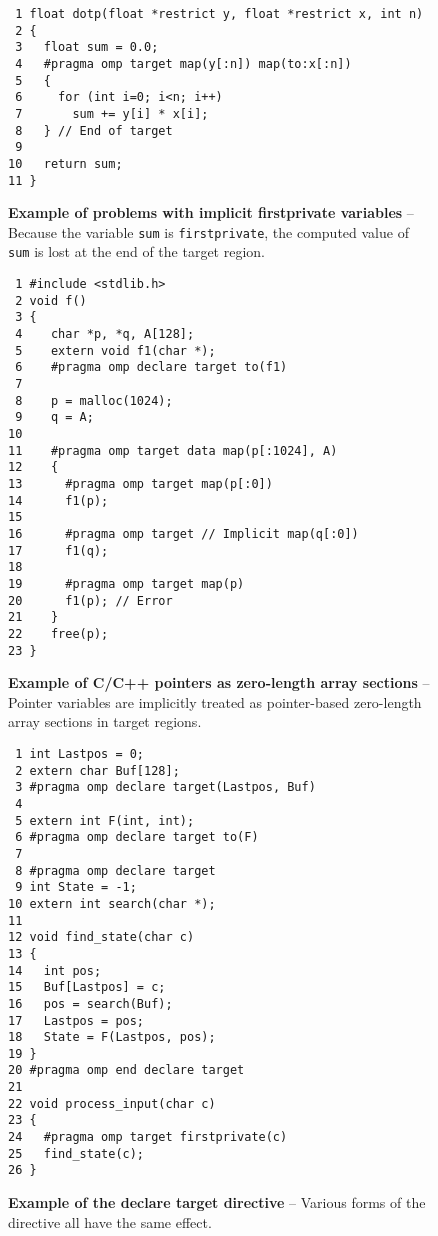 \begin{figure*}[!tb]
\begin{verbatim}
 1 float dotp(float *restrict y, float *restrict x, int n)
 2 {
 3   float sum = 0.0;
 4   #pragma omp target map(y[:n]) map(to:x[:n])
 5   {
 6     for (int i=0; i<n; i++)
 7       sum += y[i] * x[i];
 8   } // End of target
 9
10   return sum;
11 }
\end{verbatim}
\caption{ \textbf {Example of problems with implicit firstprivate variables} -- \small
          Because the variable \texttt{sum} is \texttt{firstprivate}, the computed value
          of \texttt{sum} is lost at the end of the target region.
         }
\label{figure:chapter6-defaultmap-v2}
\end{figure*}


\begin{figure*}[!tb]
\begin{verbatim}
 1 #include <stdlib.h>
 2 void f()
 3 {
 4    char *p, *q, A[128];
 5    extern void f1(char *);
 6    #pragma omp declare target to(f1) 
 7 
 8    p = malloc(1024);
 9    q = A;
10 
11    #pragma omp target data map(p[:1024], A)
12    {
13      #pragma omp target map(p[:0])
14      f1(p);
15 
16      #pragma omp target // Implicit map(q[:0])
17      f1(q);
18 
19      #pragma omp target map(p)
20      f1(p); // Error 
21    }
22    free(p);
23 }
\end{verbatim}
\caption{ \textbf {Example of C/C++ pointers as zero-length array sections} -- \small
          Pointer variables are implicitly treated as pointer-based zero-length array
          sections in target regions.
         }
\label{figure:chapter6-zerolength}
\end{figure*}


\begin{figure*}[!tb]
\begin{verbatim}
 1 int Lastpos = 0;
 2 extern char Buf[128];
 3 #pragma omp declare target(Lastpos, Buf)
 4 
 5 extern int F(int, int);
 6 #pragma omp declare target to(F)
 7 
 8 #pragma omp declare target
 9 int State = -1;
10 extern int search(char *);
11 
12 void find_state(char c)
13 {
14   int pos;
15   Buf[Lastpos] = c;
16   pos = search(Buf);
17   Lastpos = pos;
18   State = F(Lastpos, pos);
19 }
20 #pragma omp end declare target
21 
22 void process_input(char c)
23 {
24   #pragma omp target firstprivate(c)
25   find_state(c);
26 }
\end{verbatim}
\caption{ \textbf {Example of the declare target directive} -- \small
          Various forms of the directive all have the same effect.
         }
\label{figure:chapter6-decltarg}
\end{figure*}


